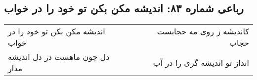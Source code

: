 \begin{center}
\section*{رباعی شماره ۸۳: اندیشه مکن بکن تو خود را در خواب}
\label{sec:0083}
\begin{longtable}{l p{0.5cm} r}
اندیشه مکن بکن تو خود را در خواب
&&
کاندیشه ز روی مه حجابست حجاب
\\
دل چون ماهست در دل اندیشه مدار
&&
انداز تو اندیشه گری را در آب
\\
\end{longtable}
\end{center}

